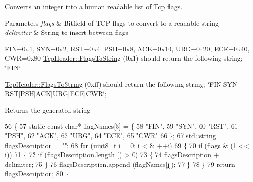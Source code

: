Converts an integer into a human readable list of Tcp flags. 


\begin{DoxyParams}{Parameters}
{\em flags} & Bitfield of T\+CP flags to convert to a readable string \\
\hline
{\em delimiter} & String to insert between flags\\
\hline
\end{DoxyParams}
F\+IN=0x1, S\+YN=0x2, R\+ST=0x4, P\+SH=0x8, A\+CK=0x10, U\+RG=0x20, E\+CE=0x40, C\+WR=0x80 \hyperlink{classns3_1_1TcpHeader_aaaa261ca12b0fb50e45c7083cec88cff}{Tcp\+Header\+::\+Flags\+To\+String} (0x1) should return the following string; \char`\"{}\+F\+I\+N\char`\"{}

\hyperlink{classns3_1_1TcpHeader_aaaa261ca12b0fb50e45c7083cec88cff}{Tcp\+Header\+::\+Flags\+To\+String} (0xff) should return the following string; \char`\"{}\+F\+I\+N$\vert$\+S\+Y\+N$\vert$\+R\+S\+T$\vert$\+P\+S\+H$\vert$\+A\+C\+K$\vert$\+U\+R\+G$\vert$\+E\+C\+E$\vert$\+C\+W\+R\char`\"{};

\begin{DoxyReturn}{Returns}
the generated string 
\end{DoxyReturn}

\begin{DoxyCode}
56 \{
57   \textcolor{keyword}{static} \textcolor{keyword}{const} \textcolor{keywordtype}{char}* flagNames[8] = \{
58     \textcolor{stringliteral}{"FIN"},
59     \textcolor{stringliteral}{"SYN"},
60     \textcolor{stringliteral}{"RST"},
61     \textcolor{stringliteral}{"PSH"},
62     \textcolor{stringliteral}{"ACK"},
63     \textcolor{stringliteral}{"URG"},
64     \textcolor{stringliteral}{"ECE"},
65     \textcolor{stringliteral}{"CWR"}
66   \};
67   std::string flagsDescription = \textcolor{stringliteral}{""};
68   \textcolor{keywordflow}{for} (uint8\_t \hyperlink{bernuolliDistribution_8m_a6f6ccfcf58b31cb6412107d9d5281426}{i} = 0; \hyperlink{bernuolliDistribution_8m_a6f6ccfcf58b31cb6412107d9d5281426}{i} < 8; ++\hyperlink{bernuolliDistribution_8m_a6f6ccfcf58b31cb6412107d9d5281426}{i})
69     \{
70       \textcolor{keywordflow}{if} (flags & (1 << \hyperlink{bernuolliDistribution_8m_a6f6ccfcf58b31cb6412107d9d5281426}{i}))
71         \{
72           \textcolor{keywordflow}{if} (flagsDescription.length () > 0)
73             \{
74               flagsDescription += delimiter;
75             \}
76           flagsDescription.append (flagNames[\hyperlink{bernuolliDistribution_8m_a6f6ccfcf58b31cb6412107d9d5281426}{i}]);
77         \}
78     \}
79   \textcolor{keywordflow}{return} flagsDescription;
80 \}
\end{DoxyCode}


